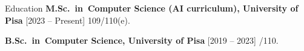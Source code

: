 \begin{rubric}{Education}
\entry*%
	\textbf{M.Sc.~in~Computer Science (AI curriculum), University of Pisa} [2023 -- Present] {\mbox{}\hfill 109/110(e)}.\par
% 
\entry*%
	\textbf{B.Sc.~in~Computer Science, University of Pisa} [2019 -- 2023] {\mbox{}\hfill {}/110}.
\end{rubric}

